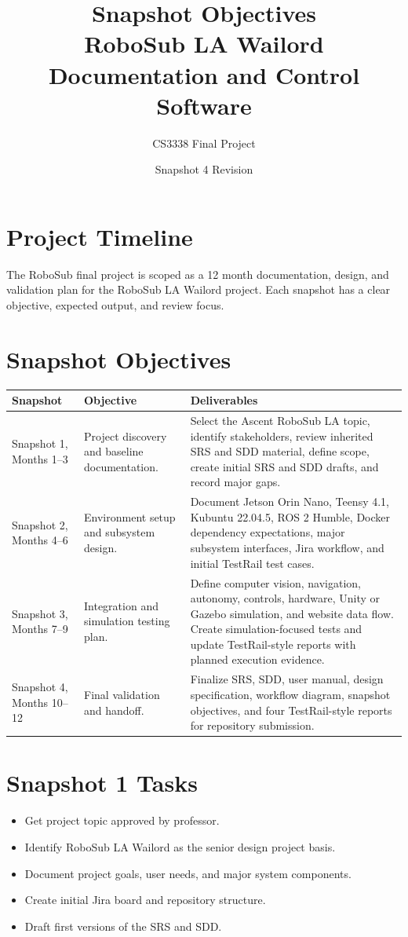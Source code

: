 \documentclass[12pt]{article}
\title{Snapshot Objectives\\RoboSub LA Wailord Documentation and Control Software}
\author{CS3338 Final Project}
\date{Snapshot 4 Revision}
\begin{document}
\maketitle
\tableofcontents
\newpage

\section{Project Timeline}
The RoboSub final project is scoped as a 12 month documentation, design, and validation plan for the RoboSub LA Wailord project. Each snapshot has a clear objective, expected output, and review focus.

\section{Snapshot Objectives}
\begin{longtable}{|p{}|p{}|p{}|}
\hline
\textbf{Snapshot} & \textbf{Objective} & \textbf{Deliverables} \\
\hline
Snapshot 1, Months 1--3 & Project discovery and baseline documentation. & Select the Ascent RoboSub LA topic, identify stakeholders, review inherited SRS and SDD material, define scope, create initial SRS and SDD drafts, and record major gaps. \\
\hline
Snapshot 2, Months 4--6 & Environment setup and subsystem design. & Document Jetson Orin Nano, Teensy 4.1, Kubuntu 22.04.5, ROS 2 Humble, Docker dependency expectations, major subsystem interfaces, Jira workflow, and initial TestRail test cases. \\
\hline
Snapshot 3, Months 7--9 & Integration and simulation testing plan. & Define computer vision, navigation, autonomy, controls, hardware, Unity or Gazebo simulation, and website data flow. Create simulation-focused tests and update TestRail-style reports with planned execution evidence. \\
\hline
Snapshot 4, Months 10--12 & Final validation and handoff. & Finalize SRS, SDD, user manual, design specification, workflow diagram, snapshot objectives, and four TestRail-style reports for repository submission. \\
\hline
\end{longtable}

\section{Snapshot 1 Tasks}
\begin{itemize}[leftmargin=*]
  \item Get project topic approved by professor.
  \item Identify RoboSub LA Wailord as the senior design project basis.
  \item Document project goals, user needs, and major system components.
  \item Create initial Jira board and repository structure.
  \item Draft first versions of the SRS and SDD.
\end{itemize}
\end{document}
